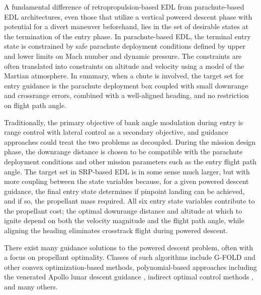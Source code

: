 A fundamental difference of retropropulsion-based EDL from parachute-based EDL architectures, even those that utilize a vertical powered descent phase with potential for a divert maneuver beforehand, lies in the set of desirable states at the termination of the entry phase. In parachute-based EDL, the terminal entry state is constrained by safe parachute deployment conditions defined by upper and lower limits on Mach number and dynamic pressure. The constraints are often translated into constraints on altitude and velocity using a model of the Martian atmosphere. In summary, when a chute is involved, the target set for entry guidance is the parachute deployment box coupled with small downrange and crossrange errors, combined with a well-aligned heading, and no restriction on flight path angle. 

Traditionally, the primary objective of bank angle modulation during entry is range control with lateral control as a secondary objective, and guidance approaches could treat the two problems as decoupled. During the mission design phase, the downrange distance is chosen to be compatible with the parachute deployment conditions and other mission parameters such as the entry flight path angle. The target set in SRP-based EDL is in some sense much larger, but with more coupling between the state variables because, for a given powered descent guidance, the final entry state determines if pinpoint landing can be achieved, and if so, the propellant mass required. All six entry state variables contribute to the propellant cost; the optimal downrange distance and altitude at which to ignite depend on both the velocity magnitude and the flight path angle, while aligning the heading eliminates crosstrack flight during powered descent. 


There exist many guidance solutions to the powered descent problem, often with a focus on propellant optimality. Classes of such algorithms include G-FOLD \cite{gfold,gfold_flighttests} and other convex optimization-based methods, polynomial-based approaches including the venerated Apollo lunar descent guidance \cite{apollo_lunar}, indirect optimal control methods \cite{PropellantOptimalAdaptiveTrigger}, and many others. 

